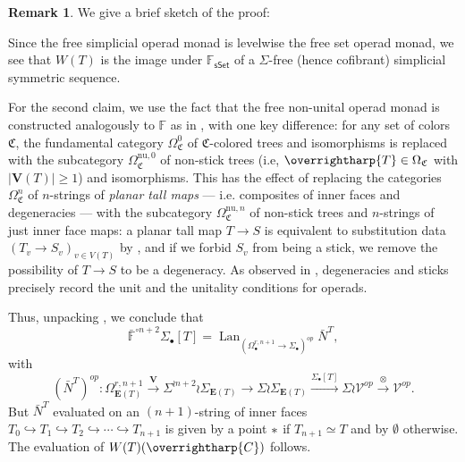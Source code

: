 \documentclass[a4paper,10pt
,draft
]{article}%
\numberwithin{equation}{section}
\numberwithin{figure}{section}
\theoremstyle{definition} %
\newtheorem{remark}[equation]{Remark}%
\newcommand{\longto}{\longrightarrow}%
\newcommand{\vect}[1]{\text{\overrightharp{\ensuremath{#1}}}}
\newcommand{\sSet}{\ensuremath{\mathsf{sSet}}}%
\DeclareMathOperator{\Lan}{Lan}%
\newcommand{\V}{\ensuremath{\mathcal V}}
\newcommand{\1}{\ensuremath{\mathbbm 1}}%
\begin{document}
\begin{remark}
      We give a brief sketch of the proof:
      
      Since the free simplicial operad monad is levelwise the free set operad monad,
      we see that $W(T)$ is the image under $\mathbb F_{\sSet}$ of a $\Sigma$-free (hence cofibrant) simplicial symmetric sequence.
      
      For the second claim, we use the fact that the free non-unital operad monad
      is constructed analogously to $\mathbb F$ as in \cite[\S A]{BP_HGOP}, %
      with one key difference:
      for any set of colors $\mathfrak C$,
      the fundamental category $\Omega_{\mathfrak C}^0$ of $\mathfrak C$-colored trees and isomorphisms
      is replaced with the subcategory $\Omega_{\mathfrak C}^{\textrm{nu},0}$ of non-stick trees (i.e, $\vect T \in \Omega_{\mathfrak C}$ with $|\boldsymbol{V}(T)| \geq 1$) and isomorphisms.
      This has the effect of replacing the categories $\Omega_{\mathfrak C}^n$ of $n$-strings of \textit{planar tall maps} --- i.e. composites of inner faces and degeneracies --- 
      with the subcategory $\Omega_{\mathfrak C}^{\textrm{nu},n}$ of
      non-stick trees and $n$-strings of just inner face maps:
      a planar tall map $T \to S$ is equivalent to substitution data $(T_v \to S_v)_{v \in V(T)}$ by \cite[Prop. 3.41]{BP_geo},
      and if we forbid $S_v$ from being a stick,
      we remove the possibility of $T \to S$ to be a degeneracy.
      As observed in \cite{BP_geo} , degeneracies and sticks precisely record the unit and the unitality conditions for operads.
      
      Thus, unpacking \cite[\S A]{BP_HGOP}, we conclude that
      \[
            \bar{\mathbb F}^{\circ n+2} \Sigma_\bullet[T] = \Lan_{(\Omega_\bullet^{r,n+1}\to \Sigma_\bullet)^{op}} \bar N^{T},
      \]
      with
      \[
            \left(\bar N^{T}\right)^{op} \colon
            \Omega_{\boldsymbol E(T)}^{r, n+1} \xrightarrow{\boldsymbol{V}}
            \Sigma^{\wr n+2} \wr \Sigma_{\boldsymbol E(T)} \longto
            \Sigma \wr \Sigma_{\boldsymbol E(T)} \xrightarrow{\Sigma_\bullet[T]}
            \Sigma \wr \V^{op} \xrightarrow{\otimes}
            \V^{op}.
      \]
      But $\bar N^T$ evaluated on an $(n+1)$-string of inner faces
      $T_0 \hookrightarrow T_1 
      \hookrightarrow T_2 
      \hookrightarrow \cdots
      \hookrightarrow T_{n+1}$
      is given by a point $\**$
      if $T_{n+1} \simeq T$
      and by $\emptyset$ otherwise.
      The evaluation of $W(T)(\vect C)$ follows.
\end{remark}
\end{document}
